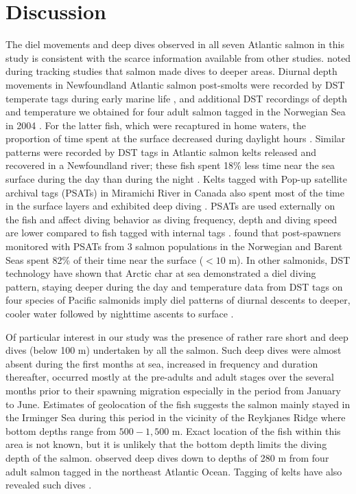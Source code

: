 \section{Discussion}
\label{Dis}
The diel movements and deep dives observed in all seven Atlantic salmon in this study is consistent with the scarce information available from other studies. 
\cite{Westerberg1982a} noted during tracking studies that salmon made dives to deeper areas. 
Diurnal depth movements in Newfoundland Atlantic salmon post-smolts were recorded by DST temperate tags during early marine life \citep{Reddin2006}, and additional DST recordings of depth and temperature we obtained for four adult salmon tagged in the Norwegian Sea in 2004 \citep{Holm2006}. 
For the latter fish, which were recaptured in home waters, the proportion of time spent at the surface decreased during daylight hours \citep{Holm2006}. 
Similar patterns were recorded by DST tags in Atlantic salmon kelts released and recovered in a Newfoundland river; these fish spent 18\% less time near the sea surface during the day than during the night \citep{Reddin2011}. 
Kelts tagged with Pop-up satellite archival tags (PSATs) in Miramichi River in Canada also spent most of the time in the surface layers and exhibited deep diving \citep{Strom2017}. 
PSATs are used externally on the fish and affect diving behavior as diving frequency, depth and diving speed are lower compared to fish tagged with internal tags \citep{Hedger2016}. 
\citet{Hedger2017} found that post-spawners monitored with PSATs from 3 salmon populations in the Norwegian and Barent Seas spent 82\% of their time near the surface ($<10$ m).
In other salmonids, DST technology have shown that Arctic char at sea demonstrated a diel diving pattern, staying deeper during the day \citep{Rikardsen2007} and temperature data from DST tags on four species of Pacific salmonids imply diel patterns of diurnal descents to deeper, cooler water followed by nighttime ascents to surface \citep{Walker2000}.

Of particular interest in our study was the presence of rather rare short and deep dives (below 100 m) undertaken by all the salmon. 
Such deep dives were almost absent during the first months at sea, increased in frequency and duration thereafter, occurred mostly at the pre-adults and adult stages over the several months prior to their spawning migration especially in the period from January to June.  
Estimates of geolocation of the fish suggests the salmon mainly stayed in the Irminger Sea during this period \citep{Gudjonsson2015} in the vicinity of the Reykjanes Ridge where bottom depths range from $500 - 1,500$ m.  
Exact location of the fish within this area is not known, but it is unlikely that the bottom depth limits the diving depth of the salmon. 
\cite{Holm2006} observed deep dives down to depths of 280 m from four adult salmon tagged in the northeast Atlantic Ocean. 
Tagging of kelts have also revealed such dives \citep{Reddin2011,Chittenden2013,Strom2017}.

